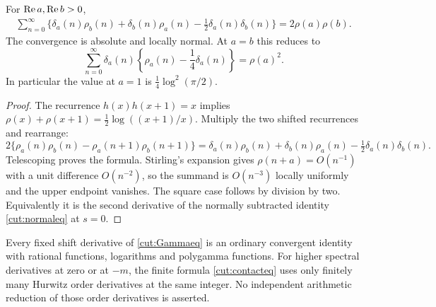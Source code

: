 \begin{corollary}\label{cut:Gamma}
For $\operatorname{Re} a,\operatorname{Re} b>0$,
\begin{align}
 \sum_{n=0}^{\infty}\bigl\{
   \delta_a(n)\rho_b(n)+\delta_b(n)\rho_a(n)
        -\tfrac12\delta_a(n)\delta_b(n)\bigr\}
 =2\rho(a)\rho(b).
 \label{cut:Gammaeq}
\end{align}
The convergence is absolute and locally normal. At $a=b$ this reduces to
\begin{equation}\label{cut:Gammasquare}
 \sum_{n=0}^{\infty}\delta_a(n)
       \left\{\rho_a(n)-\frac14\delta_a(n)\right\}=\rho(a)^2.
\end{equation}
In particular the value at $a=1$ is $\tfrac14\log^2(\pi/2)$.
\end{corollary}
\begin{proof}
The recurrence $h(x)h(x+1)=x$ implies
$\rho(x)+\rho(x+1)=\tfrac12\log((x+1)/x)$.
Multiply the two shifted recurrences and rearrange:
\[
 2\{\rho_a(n)\rho_b(n)-\rho_a(n+1)\rho_b(n+1)\}
 =\delta_a(n)\rho_b(n)+\delta_b(n)\rho_a(n)
            -\tfrac12\delta_a(n)\delta_b(n).
\]
Telescoping proves the formula. Stirling's expansion gives
$\rho(n+a)=O(n^{-1})$ with a unit difference $O(n^{-2})$, so the
summand is $O(n^{-3})$ locally uniformly and the upper endpoint vanishes.
The square case follows by division by two. Equivalently it is the
second derivative of the normally subtracted identity
\eqref{cut:normaleq} at $s=0$.
\end{proof}

Every fixed shift derivative of \eqref{cut:Gammaeq} is an ordinary
convergent identity with rational functions, logarithms and polygamma
functions. For higher spectral derivatives at zero or at $-m$, the
finite formula \eqref{cut:contacteq} uses only finitely many Hurwitz
order derivatives at the same integer. No independent arithmetic
reduction of those order derivatives is asserted.
